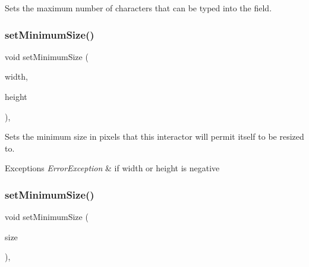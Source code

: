Sets the maximum number of characters that can be typed into the field. 

\mbox{\label{classGInteractor_a0cf428e207b7f22cc08138a90b1b87b2}} 
\subsubsection{\texorpdfstring{set\+Minimum\+Size()}{setMinimumSize()}\hspace{0.1cm}{\footnotesize\ttfamily [1/2]}}
{\footnotesize\ttfamily void set\+Minimum\+Size (\begin{DoxyParamCaption}\item[{double}]{width,  }\item[{double}]{height }\end{DoxyParamCaption})\hspace{0.3cm}{\ttfamily [virtual]}, {\ttfamily [inherited]}}



Sets the minimum size in pixels that this interactor will permit itself to be resized to. 


\begin{DoxyExceptions}{Exceptions}
{\em Error\+Exception} & if width or height is negative \\
\hline
\end{DoxyExceptions}
\mbox{\label{classGInteractor_a3b1046117ac6cb7abe467e00ba8a81f4}} 
\subsubsection{\texorpdfstring{set\+Minimum\+Size()}{setMinimumSize()}\hspace{0.1cm}{\footnotesize\ttfamily [2/2]}}
{\footnotesize\ttfamily void set\+Minimum\+Size (\begin{DoxyParamCaption}\item[{const \mbox{\hyperlink{structGDimension}{G\+Dimension}} \&}]{size }\end{DoxyParamCaption})\hspace{0.3cm}{\ttfamily [virtual]}, {\ttfamily [inherited]}}



